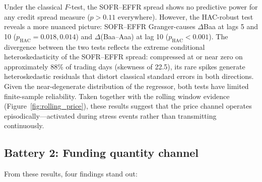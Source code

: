 \documentclass[12pt,a4paper]{article}
\begin{document}


Under the classical $F$-test, the SOFR--EFFR spread shows no predictive power for any credit spread measure ($p > 0.11$ everywhere). However, the HAC-robust test reveals a more nuanced picture: SOFR--EFFR Granger-causes $\Delta$Baa at lags 5 and 10 ($p_{\text{HAC}} = 0.018, 0.014$) and $\Delta$(Baa--Aaa) at lag 10 ($p_{\text{HAC}} < 0.001$). The divergence between the two tests reflects the extreme conditional heteroskedasticity of the SOFR--EFFR spread: compressed at or near zero on approximately 88\% of trading days (skewness of 22.5), its rare spikes generate heteroskedastic residuals that distort classical standard errors in both directions. Given the near-degenerate distribution of the regressor, both tests have limited finite-sample reliability. Taken together with the rolling window evidence (Figure~\ref{fig:rolling_price}), these results suggest that the price channel operates episodically---activated during stress events rather than transmitting continuously.

\subsection{Battery 2: Funding quantity channel}



From these results, four findings stand out:
\end{document}
